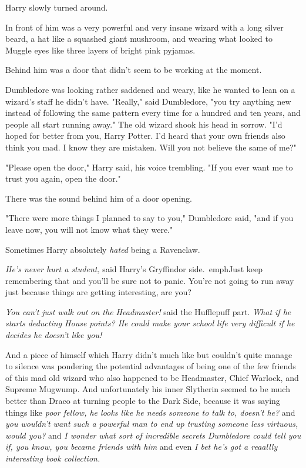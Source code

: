 Harry slowly turned around.

In front of him was a very powerful and very insane wizard with a long silver 
beard, a hat like a squashed giant mushroom, and wearing what looked to Muggle 
eyes like three layers of bright pink pyjamas.

Behind him was a door that didn't seem to be working at the moment.

Dumbledore was looking rather saddened and weary, like he wanted to lean on a 
wizard's staff he didn't have. "Really," said Dumbledore, "you try anything new 
instead of following the same pattern every time for a hundred and ten years, 
and people all start running away." The old wizard shook his head in sorrow. 
"I'd hoped for better from you, Harry Potter. I'd heard that your own friends 
also think you mad. I know they are mistaken. Will you not believe the same of 
me?"

"Please open the door," Harry said, his voice trembling. "If you ever want me 
to trust you again, open the door."

There was the sound behind him of a door opening.

"There were more things I planned to say to you," Dumbledore said, "and if you 
leave now, you will not know what they were."

Sometimes Harry absolutely \emph{hated} being a Ravenclaw.

\emph{He's never hurt a student,} said Harry's Gryffindor side.\ emph{Just keep 
remembering that and you'll be sure not to panic. You're not going to run away 
just because things are getting interesting, are you?}

\emph{You can't just walk out on the Headmaster!} said the Hufflepuff part. 
\emph{What if he starts deducting House points? He could make your school life 
very difficult if he decides he doesn't like you!}

And a piece of himself which Harry didn't much like but couldn't quite manage 
to silence was pondering the potential advantages of being one of the few 
friends of this mad old wizard who also happened to be Headmaster, Chief 
Warlock, and Supreme Mugwump. And unfortunately his inner Slytherin seemed to 
be much better than Draco at turning people to the Dark Side, because it was 
saying things like \emph{poor fellow, he looks like he needs someone to talk 
to, doesn't he?} and \emph{you wouldn't want such a powerful man to end up 
trusting someone less virtuous, would you?} and \emph{I wonder what sort of 
incredible secrets Dumbledore could tell you if, you know, you became friends 
with him} and even \emph{I bet he's got a reaallly interesting book collection.}

